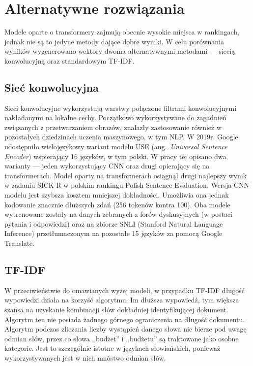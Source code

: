 \section{Alternatywne rozwiązania}
	Modele oparte o transformery zajmują obecnie wysokie miejsca w rankingach, jednak nie są to jedyne metody dające dobre wyniki.
	W celu porównania wyników wygenerowano wektory dwoma alternatywnymi metodami --- siecią konwolucyjną oraz standardowym TF-IDF\@.

	\subsection{Sieć konwolucyjna}
		Sieci konwolucyjne wykorzystują warstwy połączone filtrami konwolucyjnymi nakładanymi na lokalne cechy.
		Początkowo wykorzystywane do zagadnień związanych z przetwarzaniem obrazów,
			znalazły zastosowanie również w pozostałych dziedzinach uczenia maszynowego, w tym NLP\@.
		W 2019r. Google udostępniło wielojęzykowy wariant modelu USE (ang.\ \emph{Universal Sentence Encoder})\cite{use_multilingual} wspierający 16 języków, w tym polski.
		W pracy tej opisano dwa warianty --- jeden wykorzystujący CNN oraz drugi opierający się na transformerach.
		Model oparty na transformerach osiągnął drugi najlepszy wynik w zadaniu SICK-R w polskim rankingu Polish Sentence Evaluation\cite{sentence_eval}.
		Wersja CNN modelu jest szybsza kosztem mniejszej dokładności.
		Umożliwia ona jednak kodowanie znacznie dłuższych zdań (256 tokenów kontra 100).
		Oba modele wytrenowane zostały na danych zebranych z forów dyskusyjnych (w postaci pytania i odpowiedzi)
			oraz na zbiorze SNLI (Stanford Natural Language Inference) przetłumaczonym na pozostałe 15 języków za pomocą Google Translate.

	\subsection{TF-IDF}
		W przeciwieństwie do omawianych wyżej modeli, w przypadku TF-IDF długość wypowiedzi działa na korzyść algorytmu.
		Im dłuższa wypowiedź, tym większa szansa na uzyskanie kombinacji słów dokładniej identyfikującej dokument.
		Algorytm ten nie posiada żadnego górnego ograniczenia na długość dokumentu.
		Algorytm podczas zliczania liczby wystąpień danego słowa nie bierze pod uwagę odmian słów,
			przez co słowa ,,budżet'' i ,,budżetu'' są traktowane jako osobne kategorie.
		Jest to szczególnie istotne w językach słowiańskich, ponieważ wykorzystywanych jest w nich mnóstwo odmian słów.
		
